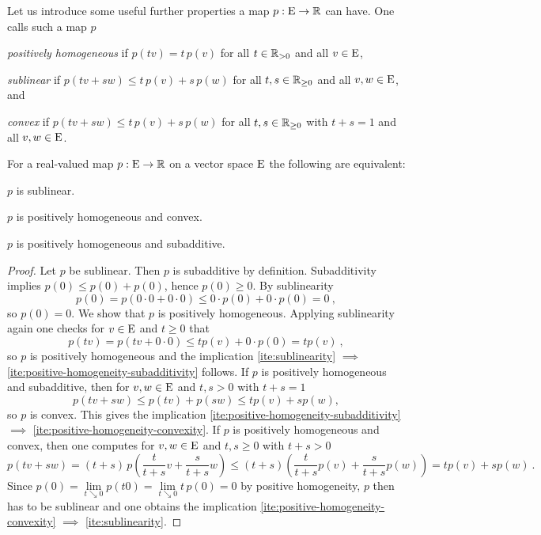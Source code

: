 \para
 Let us introduce some useful further properties a map $p:\mathrm{E} \to \mathbb{R}$
 can have.  One calls such a map $p$
 \begin{axiomlist}[]
 \item\label{ite:definition-positive-homogeneity}
   \emph{positively homogeneous} if $p (tv) = t\, p(v)$ for all $t\in \mathbb{R}_{> 0}$ and all $v\in \mathrm{E}$,
 \item\label{ite:definition-sublinearity}
   \emph{sublinear} if $p (tv + sw) \leq  t\, p(v) + s\, p(w)$ for all $t,s\in \mathbb{R}_{\geq 0}$
   and all $v,w\in \mathrm{E}$, and 
 \item\label{ite:definition-convexity}
   \emph{convex} if $p (tv + sw) \leq  t\, p(v) + s\, p(w)$ for all $t,s\in \mathbb{R}_{\geq 0}$
   with $t+s=1$ and all $v,w\in \mathrm{E}$.
 \end{axiomlist}

\begin{lemma}\label{thm:equivalent-characterizations-sublinearity}
   For a real-valued map $p:\mathrm{E} \to \mathbb{R}$ on a vector space $\mathrm{E}$ the following are equivalent:
   \begin{romanlist}
   \item\label{ite:sublinearity}
     $p$ is sublinear.
   \item\label{ite:positive-homogeneity-convexity}
     $p$ is positively homogeneous and convex.
   \item\label{ite:positive-homogeneity-subadditivity}
     $p$ is positively homogeneous and subadditive. 
   \end{romanlist}
 \end{lemma}
 \begin{proof}
   Let $p$ be sublinear. Then $p$ is subadditive by definition. Subadditivity implies
   $p(0) \leq p(0) + p(0)$, hence $p(0)\geq 0$. 
   By sublinearity
   \[ p(0) = p(0\cdot 0 + 0\cdot 0) \leq 0 \cdot p(0) +  0\cdot p(0) =  0 \ , \]
   so $p(0)=0$.  We show that $p$ is positively homogeneous.
   Applying sublinearity again one checks for $v\in \mathrm{E}$ and $t\geq 0$ that
   \[ p(tv)=p(tv+ 0\cdot 0) \leq t p(v) + 0 \cdot p(0)= tp(v) \ , \]
   so $p$ is positively homogeneous and the implication
   \ref{ite:sublinearity} $\implies$ \ref{ite:positive-homogeneity-subadditivity} follows.
 If $p$ is positively homogeneous and subadditive, then for $v,w \in \mathrm{E}$ and
 $t,s> 0$ with $t +s =1$
 \[
     p(tv +sw) \leq p(tv) + p(sw) \leq t p(v) + s p(w),
 \]  
 so $p$ is convex. This gives the implication
 \ref{ite:positive-homogeneity-subadditivity} $\implies$ \ref{ite:positive-homogeneity-convexity}. 
 If $p$ is positively homogeneous and convex, then one computes for $v,w \in \mathrm{E}$ and $t,s\geq 0$
 with $t+s >0$
 \[
   p( tv +sw )  = %
   (t+s)\, p \left( \frac{t}{t+s} v+ \frac{s}{t+s} w \right) \leq
   (t+s) \left( \frac{t}{t+s} p(v) +  \frac{s}{t+s} p(w) \right) = t p(v)+ sp(w) \ .
 \]
 Since $p(0)=\lim\limits_{t\searrow 0} p(t0) = \lim\limits_{t\searrow 0} t\, p(0) = 0$ by positive homogeneity,
 $p$ then has to be sublinear and one obtains the implication
 \ref{ite:positive-homogeneity-convexity}  $\implies$ \ref{ite:sublinearity}.
\end{proof}
 
